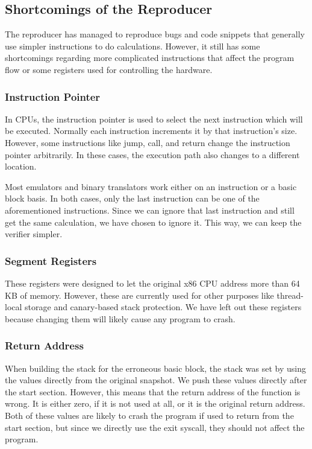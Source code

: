 \subsection{Shortcomings of the Reproducer}
The reproducer has managed to reproduce bugs and code snippets that generally use simpler instructions to do calculations.
However, it still has some shortcomings regarding more complicated instructions that affect the program flow or some registers used for controlling the hardware.

\subsubsection{Instruction Pointer}
In CPUs, the instruction pointer is used to select the next instruction which will be executed.
Normally each instruction increments it by that instruction's size.
However, some instructions like jump, call, and return change the instruction pointer arbitrarily.
In these cases, the execution path also changes to a different location.

Most emulators and binary translators work either on an instruction or a basic block basis.
In both cases, only the last instruction can be one of the aforementioned instructions.
Since we can ignore that last instruction and still get the same calculation, we have chosen to ignore it.
This way, we can keep the verifier simpler.

\subsubsection{Segment Registers}
These registers were designed to let the original x86 CPU address more than 64 KB of memory.
However, these are currently used for other purposes like thread-local storage and canary-based stack protection.
We have left out these registers because changing them will likely cause any program to crash.

\subsubsection{Return Address}
When building the stack for the erroneous basic block,  the stack was set by using the values directly from the original snapshot.
We push these values directly after the start section.
However, this means that the return address of the function is wrong.
It is either zero, if it is not used at all, or it is the original return address.
Both of these values are likely to crash the program if used to return from the start section, but since we directly use the exit syscall, they should not affect the program.

